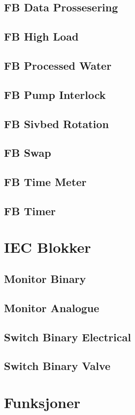 \section{FB Data Prossesering}
\section{FB High Load}
\section{FB Processed Water}
\section{FB Pump Interlock}
\section{FB Sivbed Rotation}
\section{FB Swap}
\section{FB Time Meter}
\section{FB Timer}

\chapter{IEC Blokker}
\section{Monitor Binary}
\section{Monitor Analogue}
\section{Switch Binary Electrical}
\section{Switch Binary Valve}

\chapter{Funksjoner}
